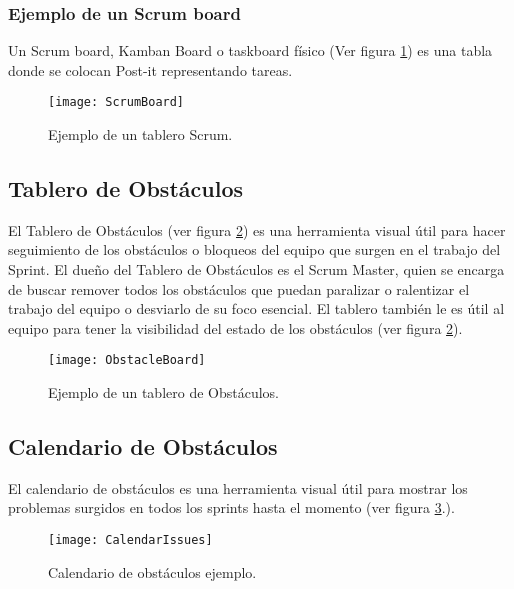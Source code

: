 \subsubsection{Ejemplo de un Scrum board}

Un Scrum board, Kamban Board o taskboard físico (Ver figura \ref{fig:ScrumBoard}) es una tabla donde se colocan Post-it representando tareas.

\begin{figure}[h]
  \centering
  \texttt{[image: ScrumBoard]}
  \caption{Ejemplo de un tablero Scrum.}
  \centering
  \label{fig:ScrumBoard} %
\end{figure}

\subsection{Tablero de Obstáculos}

El Tablero de Obstáculos (ver figura \ref{fig:ObstacleBoard}) es una herramienta visual útil para hacer seguimiento de los obstáculos o bloqueos del equipo que surgen en el trabajo del Sprint. El dueño del Tablero de Obstáculos es el Scrum Master, quien se encarga de buscar remover todos los obstáculos que puedan paralizar o ralentizar el trabajo del equipo o desviarlo de su foco esencial. El tablero también le es útil al equipo para tener la visibilidad del estado de los obstáculos (ver figura \ref{fig:ObstacleBoard}).

\begin{figure}[h]
  \centering
  \texttt{[image: ObstacleBoard]}
  \caption{Ejemplo de un tablero de Obstáculos.}
  \centering
  \label{fig:ObstacleBoard} %
\end{figure}

\subsection{Calendario de Obstáculos}

El calendario de obstáculos es una herramienta visual útil para mostrar los problemas surgidos en todos los sprints hasta el momento (ver figura \ref{fig:CalendarIssues}.).

\begin{figure}[h]
  \centering
  \texttt{[image: CalendarIssues]}
  \caption{Calendario de obstáculos ejemplo.}
  \centering
  \label{fig:CalendarIssues} %
\end{figure}

